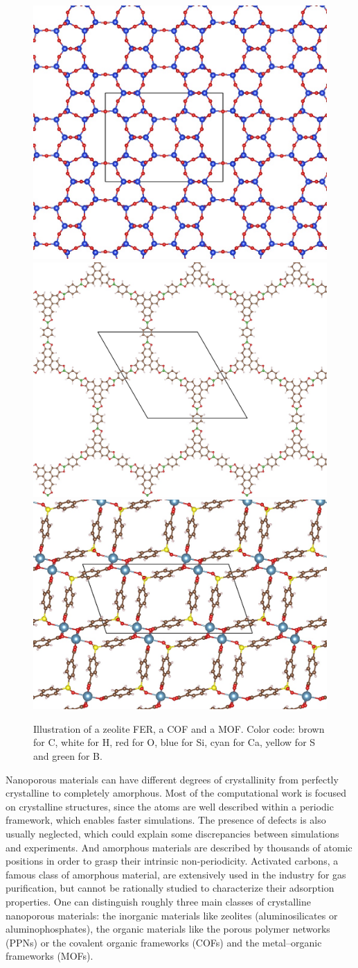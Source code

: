 \documentclass[main.tex]{subfiles}
\begin{document}
\begin{figure}[ht]
  \centering
  \includegraphics[height=0.23\textwidth]{figures/1-screening/FER.jpg}
  \includegraphics[height=0.23\textwidth]{figures/1-screening/COF-5.jpg}
  \includegraphics[height=0.23\textwidth]{figures/1-screening/SBMOF-1.jpg}
  \caption{Illustration of a zeolite FER\cite{FER}, a COF\cite{Cote_2005} and a MOF\cite{KAXQIL}. Color code: brown for C, white for H, red for O, blue for Si, cyan for Ca, yellow for S and green for B.}
\end{figure}

Nanoporous materials can have different degrees of crystallinity from perfectly crystalline to completely amorphous. Most of the computational work is focused on crystalline structures, since the atoms are well described within a periodic framework, which enables faster simulations. The presence of defects is also usually neglected, which could explain some discrepancies between simulations and experiments. And amorphous materials are described by thousands of atomic positions in order to grasp their intrinsic non-periodicity.\cite{Thyagarajan_2020} Activated carbons, a famous class of amorphous material, are extensively used in the industry for gas purification, but cannot be rationally studied to characterize their adsorption properties. One can distinguish roughly three main classes of crystalline nanoporous materials: the inorganic materials like zeolites (aluminosilicates or aluminophosphates), the organic materials like the porous polymer networks (PPNs) or the covalent organic frameworks (COFs) and the metal--organic frameworks (MOFs).
\end{document}
